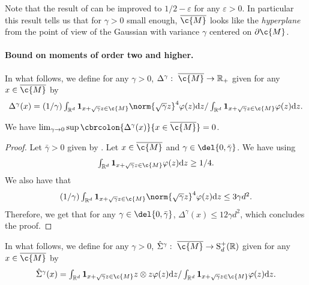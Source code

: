 Note that the result of  can be improved to $1/2-\varepsilon$ for any $\varepsilon > 0$.
In particular this result tells us that for $\gamma > 0$ small enough, $\cl{\c{M}}$ looks like the \emph{hyperplane} from the point of view of the Gaussian with variance $\gamma$ centered on $\partial \c{M}$.

\paragraph{Bound on moments of order two and higher.}

In what follows, we define for any $\gamma >0$, $\Delta^\gamma: \ \cl{\c{M}} \to \R_+$ given for any $x \in \cl{\c{M}}$ by \begin{equation} \label{eq:intermediate_Delta} \textstyle{ \Delta^\gamma(x) = (1/\gamma) \int_{\R^d} \bm{1}_{x + \sqrt{\gamma} z \in \c{M}} \norm{\sqrt{\gamma} z}^4 \varphi(z) \mathrm{d} z / \int_{\R^d} \bm{1}_{x + \sqrt{\gamma} z \in \c{M}} \varphi(z) \mathrm{d} z.
	}
\end{equation}

\begin{proposition}
	\label{prop:condition_a}
	We have $\lim_{\gamma \to 0} \sup \cbrcolon{\Delta^\gamma(x)}{x \in \cl{\c{M}}} = 0$.
\end{proposition}

\begin{proof}
	Let $\bar{\gamma} >0$ given by .
	Let $x \in \cl{\c{M}}$ and $\gamma \in \del{0, \bar{\gamma}}$.
	We have using  \begin{equation} \textstyle{\int_{\R^d} \bm{1}_{x + \sqrt{\gamma} z \in \c{M}} \varphi(z) \mathrm{d} z \geq 1/4 .
		}
	\end{equation}
	We also have that \begin{equation} \textstyle{ (1/\gamma) \int_{\R^d} \bm{1}_{x + \sqrt{\gamma} z \in \c{M}} \norm{\sqrt{\gamma} z}^4 \varphi(z) \mathrm{d} z \leq 3 \gamma d^2 .
		}
	\end{equation}
	Therefore, we get that for any $\gamma \in \del{0, \bar{\gamma}}$, $\Delta^\gamma(x) \leq 12 \gamma d^2$, which concludes the proof.
\end{proof}

In what follows, we define for any $\gamma >0$, $\hat{\Sigma}^\gamma: \ \cl{\c{M}} \to \mathrm{S}_d^+(\R)$ given for any $x \in \cl{\c{M}}$ by \begin{equation} \label{eq:intermediate_diffusion} \textstyle{ \hat{\Sigma}^\gamma(x) = \int_{\R^d} \bm{1}_{x + \sqrt{\gamma} z \in \c{M}} z \otimes z \varphi(z) \mathrm{d} z / \int_{\R^d} \bm{1}_{x + \sqrt{\gamma} z \in \c{M}} \varphi(z) \mathrm{d} z.
	}
\end{equation}

